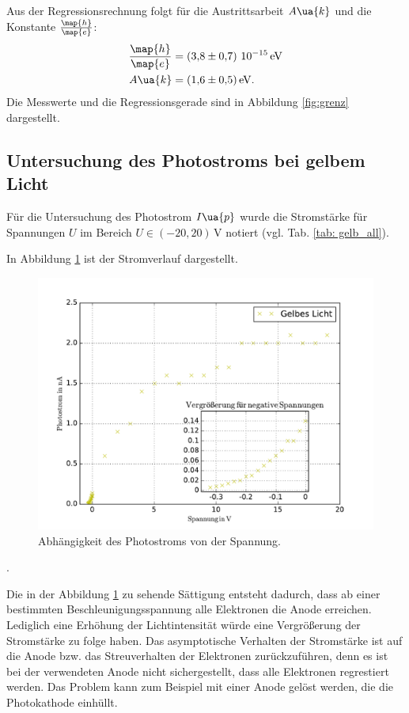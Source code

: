 Aus der Regressionsrechnung folgt für die Austrittsarbeit $A\ua{k}$ und die
Konstante $\frac{\map{h}}{\map{e}}$:
\begin{align}
  \label{eq:messergebnisse}
  \begin{aligned}
  \frac{\map{h}}{\map{e}}&= \left(\num{3.8\pm 0.7}\right)\,\num{e-15}\,\si{\eV} \\
  A\ua{k}&=\SI{1.6\pm 0.5}{\eV}.
  \end{aligned}
\end{align}
Die Messwerte und die Regressionsgerade sind in Abbildung \ref{fig:grenz} dargestellt.
\subsection{Untersuchung des Photostroms bei gelbem Licht}
Für die Untersuchung des Photostrom $I\ua{p}$ wurde die
Stromstärke für Spannungen $U$ im Bereich $U\in\left(-20,20\right)\,\si{\volt}$
notiert (vgl. Tab. \ref{tab: gelb_all}).

In Abbildung \ref{fig:gelb_all} ist der Stromverlauf dargestellt.
\begin{figure}
    \centering
    \includegraphics[width=1 \textwidth]{../Messdaten/gelb.pdf}
    \caption{Abhängigkeit des Photostroms von der Spannung.}
    \label{fig:gelb_all}
  \end{figure}.

Die in der Abbildung \ref{fig:gelb_all} zu sehende Sättigung entsteht dadurch, dass
ab einer bestimmten Beschleunigungsspannung alle Elektronen die Anode erreichen.
Lediglich eine Erhöhung der Lichtintensität würde eine Vergrößerung der Stromstärke
zu folge haben.
Das asymptotische Verhalten der Stromstärke ist auf die Anode
bzw. das Streuverhalten der Elektronen zurückzuführen, denn es ist bei der verwendeten
Anode nicht sichergestellt, dass alle Elektronen regrestiert werden.
Das Problem kann zum Beispiel mit einer Anode gelöst werden, die die Photokathode
einhüllt.

